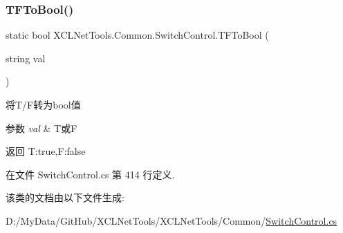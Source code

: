 \subsubsection{\texorpdfstring{T\+F\+To\+Bool()}{TFToBool()}}
{\footnotesize\ttfamily static bool X\+C\+L\+Net\+Tools.\+Common.\+Switch\+Control.\+T\+F\+To\+Bool (\begin{DoxyParamCaption}\item[{string}]{val }\end{DoxyParamCaption})\hspace{0.3cm}{\ttfamily [static]}}



将\+T/\+F转为bool值 


\begin{DoxyParams}{参数}
{\em val} & T或F\\
\hline
\end{DoxyParams}
\begin{DoxyReturn}{返回}
T\+:true,F\+:false
\end{DoxyReturn}


在文件 Switch\+Control.\+cs 第 414 行定义.



该类的文档由以下文件生成\+:\begin{DoxyCompactItemize}
\item 
D\+:/\+My\+Data/\+Git\+Hub/\+X\+C\+L\+Net\+Tools/\+X\+C\+L\+Net\+Tools/\+Common/\hyperlink{_switch_control_8cs}{Switch\+Control.\+cs}\end{DoxyCompactItemize}
